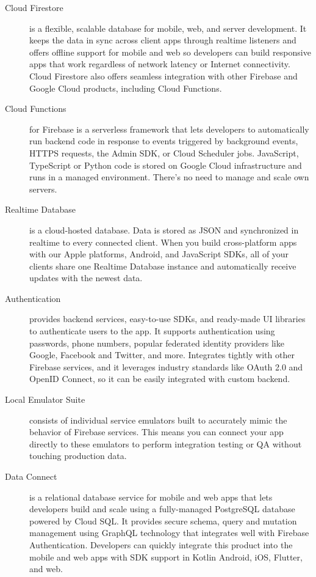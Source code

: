 \begin{description}
    \item [Cloud Firestore] is a flexible, scalable database for mobile, web, and server development. It keeps the data in sync across client apps through realtime listeners and offers offline support for mobile and web so developers can build responsive apps that work regardless of network latency or Internet connectivity. Cloud Firestore also offers seamless integration with other Firebase and Google Cloud products, including Cloud Functions.\cite{firestore2025}
    \item[Cloud Functions] for Firebase is a serverless framework that lets developers to automatically run backend code in response to events triggered by background events, HTTPS requests, the Admin SDK, or Cloud Scheduler jobs. JavaScript, TypeScript or Python code is stored on Google Cloud infrastructure and runs in a managed environment. There's no need to manage and scale own servers.\cite{firebasefunctions}
    \item[Realtime Database] is a cloud-hosted database. Data is stored as JSON and synchronized in realtime to every connected client. When you build cross-platform apps with our Apple platforms, Android, and JavaScript SDKs, all of your clients share one Realtime Database instance and automatically receive updates with the newest data.\cite{firebaseRealtime2025}
    \item[Authentication] provides backend services, easy-to-use SDKs, and ready-made UI libraries to authenticate users to the app. It supports authentication using passwords, phone numbers, popular federated identity providers like Google, Facebook and Twitter, and more. Integrates tightly with other Firebase services, and it leverages industry standards like OAuth 2.0 and OpenID Connect, so it can be easily integrated with custom backend.\cite{firebaseAuthentication}
    \item[Local Emulator Suite] consists of individual service emulators built to accurately mimic the behavior of Firebase services. This means you can connect your app directly to these emulators to perform integration testing or QA without touching production data.\cite{emulatorSuite}
    \item[Data Connect] is a relational database service for mobile and web apps that lets developers build and scale using a fully-managed PostgreSQL database powered by Cloud SQL. It provides secure schema, query and mutation management using GraphQL technology that integrates well with Firebase Authentication. Developers can quickly integrate this product into the mobile and web apps with SDK support in Kotlin Android, iOS, Flutter, and web.\cite{firebaseDataConnect}

\end{description}
